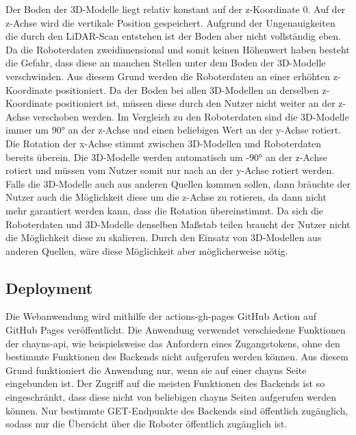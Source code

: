 Der Boden der 3D-Modelle liegt relativ konstant auf der z-Koordinate 0. Auf der z-Achse wird die vertikale Position gespeichert. Aufgrund der Ungenauigkeiten die durch den \ac{LiDAR}-Scan entstehen ist der Boden aber nicht vollständig eben. Da die Roboterdaten zweidimensional und somit keinen Höhenwert haben besteht die Gefahr, dass diese an manchen Stellen unter dem Boden der 3D-Modelle verschwinden. Aus diesem Grund werden die Roboterdaten an einer erhöhten z-Koordinate positioniert. Da der Boden bei allen 3D-Modellen an derselben z-Koordinate positioniert ist, müssen diese durch den Nutzer nicht weiter an der z-Achse verschoben werden. Im Vergleich zu den Roboterdaten sind die 3D-Modelle immer um 90° an der z-Achse und einen beliebigen Wert an der y-Achse rotiert. Die Rotation der x-Achse stimmt zwischen 3D-Modellen und Roboterdaten bereits überein. Die 3D-Modelle werden automatisch um -90° an der z-Achse rotiert und müssen vom Nutzer somit nur nach an der y-Achse rotiert werden. Falls die 3D-Modelle auch aus anderen Quellen kommen sollen, dann bräuchte der Nutzer auch die Möglichkeit diese um die z-Achse zu rotieren, da dann nicht mehr garantiert werden kann, dass die Rotation übereinstimmt. Da sich die Roboterdaten und 3D-Modelle denselben Maßstab teilen braucht der Nutzer nicht die Möglichkeit diese zu skalieren. Durch den Einsatz von 3D-Modellen aus anderen Quellen, wäre diese Möglichkeit aber möglicherweise nötig.

\subsection{Deployment}

Die Webanwendung wird mithilfe der actions-gh-pages GitHub Action auf GitHub Pages veröffentlicht.
Die Anwendung verwendet verschiedene Funktionen der chayns-api, wie beispielsweise das Anfordern eines Zugangstokens, ohne den bestimmte Funktionen des Backends nicht aufgerufen werden können. Aus diesem Grund funktioniert die Anwendung nur, wenn sie auf einer chayns Seite eingebunden ist. Der Zugriff auf die meisten Funktionen des Backends ist so eingeschränkt, dass diese nicht von beliebigen chayns Seiten aufgerufen werden können. Nur bestimmte GET-Endpunkte des Backends sind öffentlich zugänglich, sodass nur die Übersicht über die Roboter öffentlich zugänglich ist.

